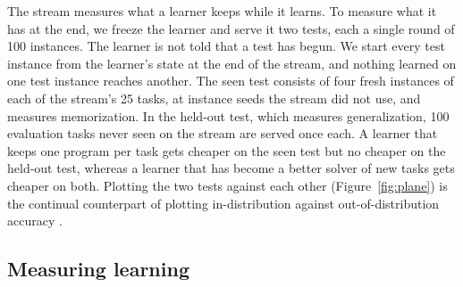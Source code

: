 The stream measures what a learner keeps while it learns. To measure what it has at the end, we freeze the learner and serve it two tests, each a single round of 100 instances. The learner is not told that a test has begun. We start every test instance from the learner's state at the end of the stream, and nothing learned on one test instance reaches another. The seen test consists of four fresh instances of each of the stream's 25 tasks, at instance seeds the stream did not use, and measures memorization. In the held-out test, which measures generalization, 100 evaluation tasks never seen on the stream are served once each. A learner that keeps one program per task gets cheaper on the seen test but no cheaper on the held-out test, whereas a learner that has become a better solver of new tasks gets cheaper on both. Plotting the two tests against each other (Figure~\ref{fig:plane}) is the continual counterpart of plotting in-distribution against out-of-distribution accuracy \citep{miller2021accuracy}.

\subsection{Measuring learning}
\label{sec:metrics}

